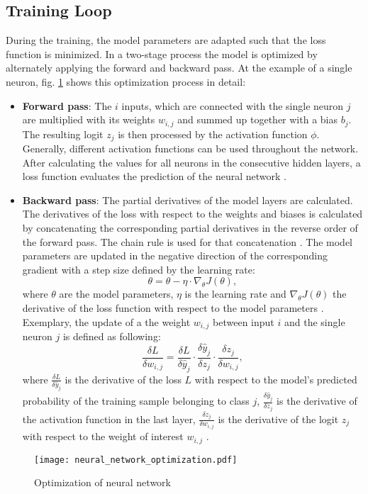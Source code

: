 \subsection{Training Loop}
During the training, the model parameters are adapted such that the loss function is minimized. In a two-stage process the model is optimized by alternately applying the forward and backward pass. At the example of a single neuron, fig. \ref{fig:neural_network_optimization} shows this optimization process in detail: 
\begin{itemize}
    \item \textbf{Forward pass}: The $i$ inputs, which are connected with the single neuron $j$ are multiplied with its weights $w_{i,j}$ and summed up together with a bias $b_{j}$. The resulting logit $z_{j}$ is then processed by the activation function $\phi$. Generally, different activation functions can be used throughout the network. After calculating the values for all neurons in the consecutive hidden layers, a loss function evaluates the prediction of the neural network \cite{AN201942}.
    \item \textbf{Backward pass}: 
    The partial derivatives of the model layers are calculated. The derivatives of the loss with respect to the weights and biases is calculated by concatenating the corresponding partial derivatives in the reverse order of the forward pass. The chain rule is used for that concatenation \cite{ShilohPerl2020}. The model parameters are updated in the negative direction of the corresponding gradient with a step size defined by the learning rate:
    \begin{equation}
        \theta = \theta - \eta \cdot {\nabla}_{\theta}J(\theta),
    \end{equation}
    where $\theta$ are the model parameters, $\eta$ is the learning rate and ${\nabla}_{\theta}J(\theta)$ the derivative of the loss function with respect to the model parameters \cite{Lydia2019}. Exemplary, the update of a the weight $w_{i,j}$ between input $i$ and the single neuron $j$ is defined as following:
    \begin{equation}
     \frac{\delta L}{\delta w_{i,j}} = \frac{\delta L}{\delta \hat{y}_{j}} \cdot \frac{\delta \hat{y}_{j}}{\delta z_{j}} \cdot \frac{\delta z_{j}}{\delta w_{i,j}}, 
     \label{chain_rule}
    \end{equation}
where $\frac{\delta L}{\delta \hat{y}_{j}}$ is the derivative of the loss $L$ with respect to the model's predicted probability of the training sample belonging to class $j$, $\frac{\delta \hat{y}_{j}}{\delta z_{j}}$ is the derivative of the activation function in the last layer, $ \frac{\delta z_{j}}{\delta w_{i,j}}$ is the derivative of the logit $z_{j}$ with respect to the weight of interest $w_{i,j}$ \cite{ShilohPerl2020}. 
\end{itemize}
\begin{figure}[H]
  \centering
  \texttt{[image: neural\_network\_optimization.pdf]}
  \caption {Optimization of neural network}
  \label{fig:neural_network_optimization}
\end{figure}

